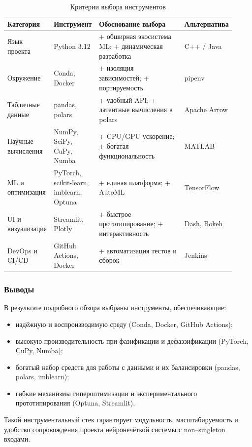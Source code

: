 \begin{table}[h]
\centering\small
\caption{Критерии выбора инструментов}
\label{tab:tool_choice}
\begin{tabular}{@{}p{0.16\linewidth}p{0.20\linewidth}p{0.44\linewidth}p{0.12\linewidth}@{}}
\toprule
\textbf{Категория} & \textbf{Инструмент} & \textbf{Обоснование выбора} & \textbf{Альтернатива} \\ \midrule
Язык проекта       & Python 3.12 & + обширная экосистема ML; + динамическая разработка  & C++ / Java \\[2pt]
Окружение          & Conda, Docker & + изоляция зависимостей; + портируемость & pipenv \\[2pt]
Табличные данные   & pandas, polars & + удобный API; + латентные вычисления в polars & Apache Arrow \\[2pt]
Научные вычисления & NumPy, SciPy, CuPy, Numba & + CPU/GPU ускорение; + богатая функциональность & MATLAB \\[2pt]
ML и оптимизация   & PyTorch, scikit-learn, imblearn, Optuna & + единая платформа; + AutoML & TensorFlow \\[2pt]
UI и визуализация  & Streamlit, Plotly & + быстрое прототипирование; + интерактивность & Dash, Bokeh \\[2pt]
DevOps и CI/CD     & GitHub Actions, Docker & + автоматизация тестов и сборок & Jenkins \\ 
\bottomrule
\end{tabular}
\end{table}

\subsubsection{Выводы}
\label{subsubsec:tool_summary}

В результате подробного обзора выбраны инструменты,
обеспечивающие:
\begin{itemize}
  \item надёжную и воспроизводимую среду (Conda, Docker, GitHub Actions);
  \item высокую производительность при фазификации и дефаззификации
        (PyTorch, CuPy, Numba);
  \item богатый набор средств для работы с данными и их балансировки
        (pandas, polars, imblearn);
  \item гибкие механизмы гипероптимизации и экспериментального
        прототипирования (Optuna, Streamlit).
\end{itemize}

Такой инструментальный стек гарантирует модульность, масштабируемость
и удобство сопровождения проекта нейронечёткой системы
с non–singleton входами.
